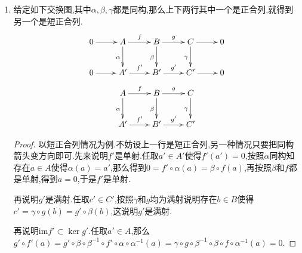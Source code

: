 \begin{enumerate}
\begin{enumerate}
\begin{proof}
			单射情况.设$b\in B$满足$\beta(b)=0$,那么有$\gamma\circ g(b)=g'\circ\beta(b)=0$,按照$\gamma$是单射,得到$g(b)=0$,于是$b\in\ker g=\mathrm{im}f$,于是存在$a\in A$使得$f(a)=b$.那么$0=\beta\circ f(a)=f'\circ\alpha(a)$,按照$f'$和$\alpha$都是单射,得到$a=0$.
			
			满射情况.设$b'\in B'$,按照$g$和$\gamma$都是满射,说明存在$b\in B$使得$g'(b')=\gamma\circ g(b)=g'\circ\beta(b)$,于是$b'-\beta(b)\in\ker g'=\mathrm{im}f'$,于是存在$a'\in A'$满足$b'-\beta(b)=f'(a')$,又按照$\alpha$是满射,存在$a\in A$满足$b'-\beta(b)=f'\circ\alpha(a)=\beta\circ f(a)$,于是$b'=\beta(b+f(a))$,这说明$\beta$是满同态.
			
			最后当$\alpha,\gamma$同时单满,上两段说明$\beta$是同构.
		\end{proof}
		\item 给定如下交换图,其中$\alpha,\beta,\gamma$都是同构,那么上下两行其中一个是正合列,就得到另一个是短正合列.
		$$\xymatrix{0\ar[r]&A\ar[d]_{\alpha}\ar[r]^{f}&B\ar[d]_{\beta}\ar[r]^{g}&C\ar[d]_{\gamma}\ar[r]&0\\0\ar[r]&A'\ar[r]^{f'}&B'\ar[r]^{g'}&C'\ar[r]&0}$$
		$$\xymatrix{&A\ar[d]_{\alpha}\ar[r]^{f}&B\ar[d]_{\beta}\ar[r]^{g}&C\ar[d]_{\gamma}&\\&A'\ar[r]^{f'}&B'\ar[r]^{g'}&C'&}$$
		\begin{proof}
			
			以短正合列情况为例.不妨设上一行是短正合列,另一种情况只要把同构箭头变方向即可.先来说明$f'$是单射.任取$a'\in A'$使得$f'(a')=0$,按照$\alpha$同构知存在$a\in A$使得$\alpha(a)=a'$,那么得到$0=f'\circ\alpha(a)=\beta\circ f(a)$,再按照$\beta$和$f$都是单射,得到$a=0$,于是$f'$是单射.
			
			再说明$g'$是满射.任取$c'\in C'$,按照$\gamma$和$g$均为满射说明存在$b\in B$使得$c'=\gamma\circ g(b)=g'\circ\beta(b)$,这说明$g'$是满射.
			
			再说明$\mathrm{im}f'\subset\ker g'$.任取$a'\in A$,那么$g'\circ f'(a)=g'\circ \beta\circ\beta^{-1}\circ f'\circ\alpha\circ\alpha^{-1}(a)=\gamma\circ g\circ\beta^{-1}\circ \beta\circ f\circ\alpha^{-1}(a)=0$.
			

\end{proof}
\end{enumerate}
\end{enumerate}
